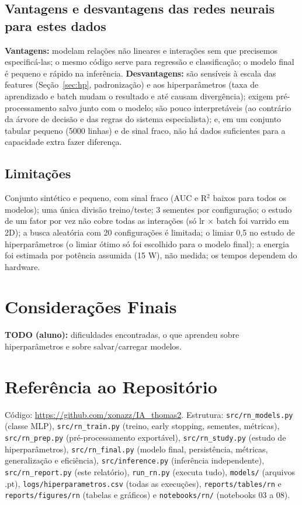 \documentclass[11pt,a4paper]{article}
\begin{document}
\subsection{Vantagens e desvantagens das redes neurais para estes dados}
\textbf{Vantagens:} modelam relações não lineares e interações sem que precisemos especificá-las; o mesmo código serve para
regressão e classificação; o modelo final é pequeno e rápido na inferência. \textbf{Desvantagens:} são sensíveis à escala das
features (Seção~\ref{sec:hp}, padronização) e aos hiperparâmetros (taxa de aprendizado e batch mudam o resultado e até causam
divergência); exigem pré-processamento salvo junto com o modelo; são pouco interpretáveis (ao contrário da árvore de decisão e das regras
do sistema especialista); e, em um conjunto tabular pequeno (5000 linhas) e de sinal fraco, não há dados suficientes para a capacidade
extra fazer diferença.

\subsection{Limitações}
Conjunto sintético e pequeno, com sinal fraco (AUC e R$^2$ baixos para todos os modelos); uma única divisão treino/teste; 3
sementes por configuração; o estudo de um fator por vez não cobre todas as interações (só lr $\times$ batch foi varrido em 2D); a busca
aleatória com 20 configurações é limitada; o limiar 0,5 no estudo de hiperparâmetros (o limiar ótimo só foi escolhido para o
modelo final); a energia foi estimada por potência assumida (15 W), não medida; os tempos dependem do hardware.

\section{Considerações Finais}
\textbf{TODO (aluno):} dificuldades encontradas, o que aprendeu sobre hiperparâmetros e sobre salvar/carregar modelos.

\section{Referência ao Repositório}
Código: \url{https://github.com/xonazz/IA_thomas2}. Estrutura: \texttt{src/rn\_models.py} (classe MLP), \texttt{src/rn\_train.py}
(treino, early stopping, sementes, métricas), \texttt{src/rn\_prep.py} (pré-processamento exportável), \texttt{src/rn\_study.py}
(estudo de hiperparâmetros), \texttt{src/rn\_final.py} (modelo final, persistência, métricas, generalização e eficiência),
\texttt{src/inference.py} (inferência independente), \texttt{src/rn\_report.py} (este relatório), \texttt{run\_rn.py} (executa tudo),
\texttt{models/} (arquivos .pt), \texttt{logs/hiperparametros.csv} (todas as execuções), \texttt{reports/tables/rn} e
\texttt{reports/figures/rn} (tabelas e gráficos) e \texttt{notebooks/rn/} (notebooks 03 a 08).
\end{document}
